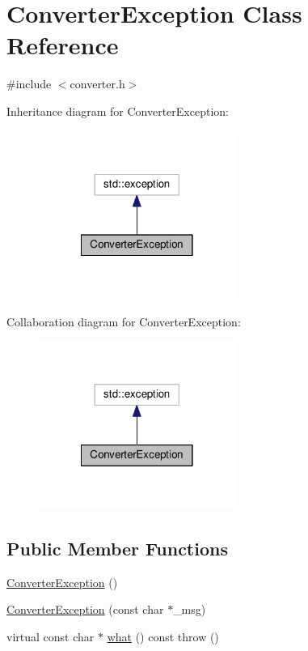 \hypertarget{class_converter_exception}{\section{Converter\-Exception Class Reference}
\label{class_converter_exception}
}


{\ttfamily \#include $<$converter.\-h$>$}



Inheritance diagram for Converter\-Exception\-:\nopagebreak
\begin{figure}[H]
\begin{center}
\leavevmode
\includegraphics[width=182pt]{class_converter_exception__inherit__graph}
\end{center}
\end{figure}


Collaboration diagram for Converter\-Exception\-:\nopagebreak
\begin{figure}[H]
\begin{center}
\leavevmode
\includegraphics[width=182pt]{class_converter_exception__coll__graph}
\end{center}
\end{figure}
\subsection*{Public Member Functions}
\begin{DoxyCompactItemize}
\item 
\hyperlink{class_converter_exception_ae452451034ab567d0d9e3c876b528017}{Converter\-Exception} ()
\item 
\hyperlink{class_converter_exception_aedf2569f75ffeb9334a0a9e100c2e765}{Converter\-Exception} (const char $\ast$\-\_\-msg)
\item 
virtual const char $\ast$ \hyperlink{class_converter_exception_a8cc1a60f8224cff62ac68d58fec565f3}{what} () const   throw ()
\end{DoxyCompactItemize}
